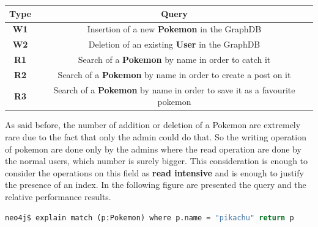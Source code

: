 \begin{center}
	\begin{tabular}{| c | c |} 
		\hline
		\textbf{Type} & \textbf{Query} \\ [0.5ex] 
		\hline
		\textbf{W1} & Insertion of a new \textbf{Pokemon} in the GraphDB\\ 
		\hline
		\textbf{W2} & Deletion of an existing \textbf{User} in the GraphDB \\
		\hline
		\textbf{R1} & Search of a \textbf{Pokemon} by name in order to catch it \\
		\hline
		\textbf{R2} & Search of a \textbf{Pokemon} by name in order to create a post on it\\
		\hline
		\textbf{R3} & Search of a \textbf{Pokemon} by name in order to save it as a favourite pokemon \\
		\hline
	\end{tabular}
\end{center}
As said before, the number of addition or deletion of a Pokemon are extremely rare due to the fact that only the admin could do that. So the writing operation of pokemon are done only by the admins where the read operation are done by the normal users, which number is surely bigger. This consideration is enough to consider the operations on this field as \textbf{read intensive} and is enough to justify the presence of an index. In the following figure are presented the query and the relative performance results.
\begin{lstlisting}[language=python]
	neo4j$ explain match (p:Pokemon) where p.name = "pikachu" return p
\end{lstlisting}

